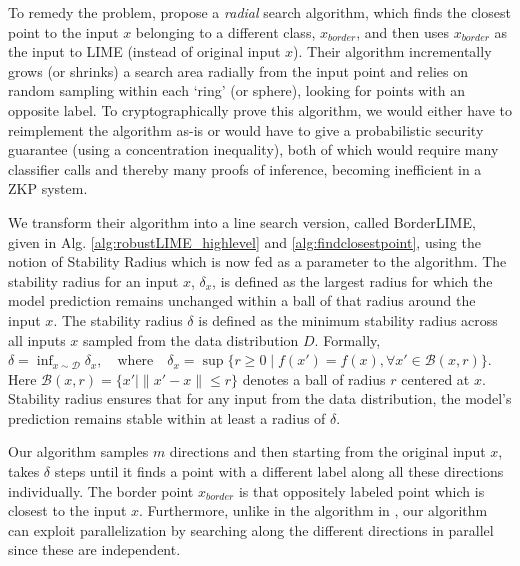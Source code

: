 To remedy the problem, \cite{laugel2017inverse, laugel2018defining} propose a \textit{radial} search algorithm, which finds the closest point to the input $x$ belonging to a different class, $x_{border}$, and then uses $x_{border}$ as the input to LIME (instead of original input $x$). Their algorithm incrementally grows (or shrinks) a search area radially from the input point and relies on random sampling within each `ring' (or sphere), looking for points with an opposite label. To cryptographically prove this algorithm, we would either have to reimplement the algorithm as-is or would have to give a probabilistic security guarantee (using a concentration inequality), both of which would require many classifier calls and thereby many proofs of inference, becoming inefficient in a ZKP system.


We transform their algorithm into a line search version, called BorderLIME, given in Alg. \ref{alg:robustLIME_highlevel} and \ref{alg:findclosestpoint}, using the notion of Stability Radius which is now fed as a parameter to the algorithm. The stability radius for an input $x$, $\delta_x$, is defined as the 
largest radius for which the model prediction remains unchanged within a ball of that radius around the input \( x \). The stability radius \( \delta \) is defined as the minimum stability radius across all inputs \( x \) sampled from the data distribution $D$. Formally,  
$
\delta = \inf_{x \sim \mathcal{D}} \delta_x, \quad \text{where} \quad \delta_x = \sup \{ r \geq 0 \mid f(x') = f(x), \forall x' \in \mathcal{B}(x, r) \}
$. Here \( \mathcal{B}(x, r) = \{ x' \mid \|x' - x\| \leq r \} \) denotes a ball of radius \( r \) centered at \( x \). Stability radius ensures that for any input from the data distribution, the model's prediction remains stable within at least a radius of \( \delta \).

Our algorithm samples $m$ directions and then starting from the original input $x$, takes $\delta$ steps until it finds a point with a different label along all these directions individually. The border point $x_{border}$ is that oppositely labeled point which is closest to the input $x$. Furthermore, unlike in the algorithm in \cite{laugel2017inverse}, our algorithm can exploit parallelization by searching along the different directions in parallel since these are independent.


